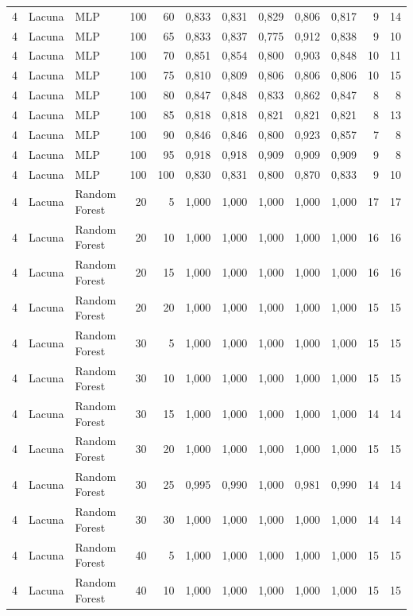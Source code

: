 \begin{longtable}{@{}rllrrrrrrrrr@{}}
4 & Lacuna & MLP & 100 & 60 & 0,833 & 0,831 & 0,829 & 0,806 & 0,817 & 9 & 14 \\
4 & Lacuna & MLP & 100 & 65 & 0,833 & 0,837 & 0,775 & 0,912 & 0,838 & 9 & 10 \\
4 & Lacuna & MLP & 100 & 70 & 0,851 & 0,854 & 0,800 & 0,903 & 0,848 & 10 & 11 \\
4 & Lacuna & MLP & 100 & 75 & 0,810 & 0,809 & 0,806 & 0,806 & 0,806 & 10 & 15 \\
4 & Lacuna & MLP & 100 & 80 & 0,847 & 0,848 & 0,833 & 0,862 & 0,847 & 8 & 8 \\
4 & Lacuna & MLP & 100 & 85 & 0,818 & 0,818 & 0,821 & 0,821 & 0,821 & 8 & 13 \\
4 & Lacuna & MLP & 100 & 90 & 0,846 & 0,846 & 0,800 & 0,923 & 0,857 & 7 & 8 \\
4 & Lacuna & MLP & 100 & 95 & 0,918 & 0,918 & 0,909 & 0,909 & 0,909 & 9 & 8 \\
4 & Lacuna & MLP & 100 & 100 & 0,830 & 0,831 & 0,800 & 0,870 & 0,833 & 9 & 10 \\
4 & Lacuna & Random Forest & 20 & 5 & 1,000 & 1,000 & 1,000 & 1,000 & 1,000 & 17 & 17 \\
4 & Lacuna & Random Forest & 20 & 10 & 1,000 & 1,000 & 1,000 & 1,000 & 1,000 & 16 & 16 \\
4 & Lacuna & Random Forest & 20 & 15 & 1,000 & 1,000 & 1,000 & 1,000 & 1,000 & 16 & 16 \\
4 & Lacuna & Random Forest & 20 & 20 & 1,000 & 1,000 & 1,000 & 1,000 & 1,000 & 15 & 15 \\
4 & Lacuna & Random Forest & 30 & 5 & 1,000 & 1,000 & 1,000 & 1,000 & 1,000 & 15 & 15 \\
4 & Lacuna & Random Forest & 30 & 10 & 1,000 & 1,000 & 1,000 & 1,000 & 1,000 & 15 & 15 \\
4 & Lacuna & Random Forest & 30 & 15 & 1,000 & 1,000 & 1,000 & 1,000 & 1,000 & 14 & 14 \\
4 & Lacuna & Random Forest & 30 & 20 & 1,000 & 1,000 & 1,000 & 1,000 & 1,000 & 15 & 15 \\
4 & Lacuna & Random Forest & 30 & 25 & 0,995 & 0,990 & 1,000 & 0,981 & 0,990 & 14 & 14 \\
4 & Lacuna & Random Forest & 30 & 30 & 1,000 & 1,000 & 1,000 & 1,000 & 1,000 & 14 & 14 \\
4 & Lacuna & Random Forest & 40 & 5 & 1,000 & 1,000 & 1,000 & 1,000 & 1,000 & 15 & 15 \\
4 & Lacuna & Random Forest & 40 & 10 & 1,000 & 1,000 & 1,000 & 1,000 & 1,000 & 15 & 15 \\

\end{longtable}

